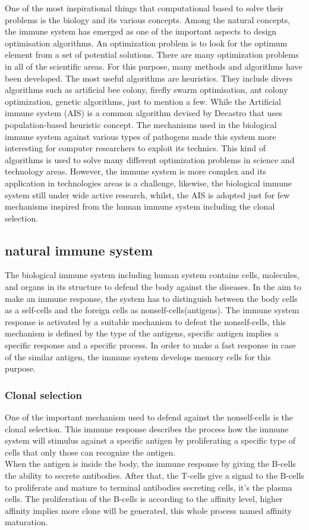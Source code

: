 \documentclass[conference]{IEEEtran}
\begin{document}
One of the most inspirational things that computational based to solve their problems\cite{doc7} is the biology and its various concepts. Among the natural concepts, the immune system has emerged as one of the important aspects to design optimisation algorithms. An optimization problem\cite{doc6} is to look for the optimum element from a set of potential solutions. There are many optimization problems in all of the scientific areas. For this purpose, many methods and algorithms have been developed. The most useful algorithms\cite{doc6} are heuristics. They include divers algorithms such as artificial bee colony, firefly swarm optimisation, ant colony optimization, genetic algorithms, just to mention a few. While the Artificial immune system (AIS) is a common algorithm devised by Decastro\cite{doc6} that uses population-based heuristic concept. The mechanisms used in the biological immune system against various types of pathogens made this system more interesting\cite{doc9} for computer researchers to exploit its technics. This kind of algorithms is used to solve many different optimization problems in science and technology areas. However, the immune system is more complex and its application in technologies areas is a challenge, likewise, the biological immune system\cite{doc7} still under wide active research, whilst, the AIS is adopted just for few mechanisms inspired from the human immune system including the clonal selection.
\subsection{natural immune system}
The biological immune system including human system contains cells, molecules, and organs in its structure to defend the body against the diseases. In the aim to make an immune response\cite{doc6}, the system has to distinguish between the body cells as a self-cells and the foreign cells as nonself-cells(antigens). The immune system response is activated by a suitable mechanism\cite{doc6} to defeat the nonself-cells, this mechanism is defined by the type of the antigens, specific antigen implies a specific response and a specific process. In order to make a fast response in case of the similar antigen, the immune system develops memory cells for this purpose.
\subsubsection*{Clonal selection}
One of the important mechanism used to defend against the nonself-cells\cite{doc6} is the clonal selection. This immune response describes the process how the immune system will stimulus against a specific antigen\cite{doc7} by proliferating a specific type of cells that only those can recognize the antigen.\\
When the antigen is inside the body, the immune response\cite{doc6} by giving the B-cells the ability to secrete antibodies. After that, the T-cells give a signal to the B-cells to proliferate and mature to terminal antibodies secreting cells, it's the plasma cells. The proliferation of the B-cells is according to the affinity level, higher affinity implies more clone will be generated, this whole process named affinity maturation.
\end{document}
